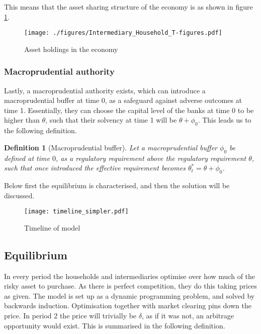 \documentclass[11pt]{article}
\newtheorem{definition}{Definition}%
\begin{document}
This means that the asset sharing structure of the economy is as shown in figure \ref{fig:t-figure}.
\begin{figure}[h]
\centering
\texttt{[image: ./figures/Intermediary\_Household\_T-figures.pdf]}
\caption{Asset holdings in the economy\\
}
\label{fig:t-figure}
\end{figure}

\subsubsection*{Macroprudential authority}
Lastly, a macroprudential authority exists, which can introduce a macroprudential buffer at time 0, as a safeguard against adverse outcomes at time 1. Essentially, they can choose the capital level of the banks at time 0 to be higher than $\theta$, such that their solvency at time 1 will be $\theta + \phi_0$. This leads us to the following definition.


\begin{definition}[Macroprudential buffer]
Let a macroprudential buffer $\phi_0$ be defined at time $0$, as a regulatory requirement above the regulatory requirement $\theta$, such that once introduced the effective requirement becomes $\theta^*_t = \theta + \phi_0$.
\end{definition}


Below first the equilibrium is characterised, and then the solution will be discussed.

\begin{figure}[h]
\centering
\texttt{[image: timeline\_simpler.pdf]}
\caption{Timeline of model\\
}
\label{fig:timeline}
\end{figure}


\subsection*{Equilibrium}
In every period the households and intermediaries optimise over how much of the risky asset to purchase. As there is perfect competition, they do this taking prices as given. The model is set up as a dynamic programming problem, and solved by backwards induction. 
Optimisation together with market clearing pins down the price.
In period 2 the price will trivially be $\delta$, as if it was not, an arbitrage opportunity would exist. This is summarised in the following definition.
\end{document}
